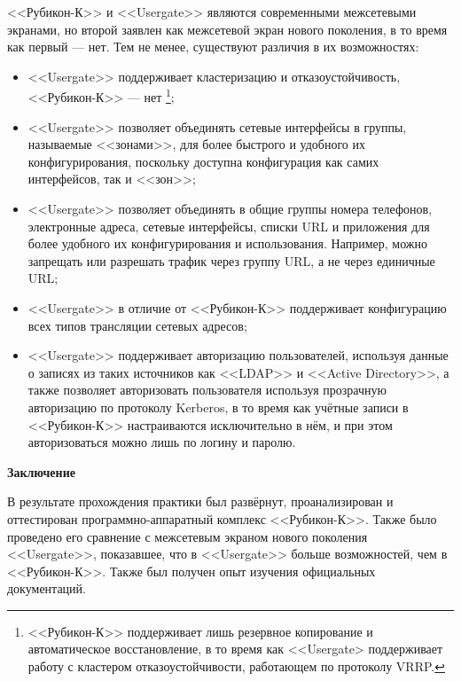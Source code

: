 <<Рубикон-К>> и <<Usergate>> являются современными межсетевыми экранами, но второй заявлен как межсетевой экран нового поколения, в то время как первый --- нет. Тем не менее, существуют различия в их возможностях:
\begin{itemize}
	\item <<Usergate>> поддерживает кластеризацию и отказоустойчивость, <<Рубикон-К>> --- нет \footnote{<<Рубикон-К>> поддерживает лишь резервное копирование и автоматическое восстановление, в то время как <<Usergate> поддерживает работу с кластером отказоустойчивости, работающем по протоколу VRRP.};
	
	\item <<Usergate>> позволяет объединять сетевые интерфейсы в группы, называемые <<зонами>>, для более быстрого и удобного их конфигурирования, поскольку доступна конфигурация как самих интерфейсов, так и <<зон>>;
	
	\item  <<Usergate>> позволяет объединять в общие группы номера телефонов, электронные адреса, сетевые интерфейсы, списки URL и приложения для более удобного их конфигурирования и использования. Например, можно запрещать или разрешать трафик через группу URL, а не через единичные URL;
	
	\item <<Usergate>> в отличие от <<Рубикон-К>> поддерживает конфигурацию всех типов трансляции сетевых адресов;

	\item <<Usergate>> поддерживает авторизацию пользователей, используя данные о записях из таких источников как <<LDAP>> и <<Active Directory>>, а также позволяет авторизовать пользователя используя прозрачную авторизацию по протоколу Kerberos, в то время как учётные записи в <<Рубикон-К>> настраиваются исключительно в нём, и при этом авторизоваться можно лишь по логину и паролю.
\end{itemize}

\newpage

\begin{center}
	\textbf{\Large Заключение}
\end{center}

В результате прохождения практики был развёрнут, проанализирован и оттестирован программно-аппаратный комплекс <<Рубикон-К>>. Также было проведено его сравнение с межсетевым экраном нового поколения <<Usergate>>, показавшее, что в <<Usergate>> больше возможностей, чем в <<Рубикон-К>>. Также был получен опыт изучения официальных документаций.

